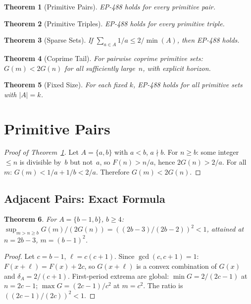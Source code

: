 \documentclass[11pt,a4paper]{article}
\newtheorem{theorem}{Theorem}[section]
\theoremstyle{definition}
\begin{document}
\begin{theorem}[Primitive Pairs]\label{thm:pairs}
EP-488 holds for every primitive pair.
\end{theorem}

\begin{theorem}[Primitive Triples]\label{thm:triples}
EP-488 holds for every primitive triple.
\end{theorem}

\begin{theorem}[Sparse Sets]\label{thm:sparse}
If $\sum_{a \in A} 1/a \leq 2/\min(A)$, then EP-488 holds.
\end{theorem}

\begin{theorem}[Coprime Tail]\label{thm:coprime-tail}
For pairwise coprime primitive sets: $G(m) < 2G(n)$ for all
sufficiently large~$n$, with explicit horizon.
\end{theorem}

\begin{theorem}[Fixed Size]\label{thm:fixed-k}
For each fixed $k$, EP-488 holds for all primitive sets with $|A| = k$.
\end{theorem}

\section{Primitive Pairs}

\begin{proof}[Proof of Theorem~\ref{thm:pairs}]
Let $A = \{a, b\}$ with $a < b$, $a \nmid b$. For $n \geq b$: some
integer $\leq n$ is divisible by~$b$ but not~$a$, so $F(n) > n/a$,
hence $2G(n) > 2/a$. For all~$m$:
$G(m) < 1/a + 1/b < 2/a$. Therefore $G(m) < 2G(n)$.
\end{proof}

\subsection{Adjacent Pairs: Exact Formula}

\begin{theorem}\label{thm:adjacent}
For $A = \{b{-}1, b\}$, $b \geq 4$:
$\sup_{m>n \geq b} G(m)/(2G(n)) = ((2b{-}3)/(2b{-}2))^2 < 1$,
attained at $n = 2b{-}3$, $m = (b{-}1)^2$.
\end{theorem}

\begin{proof}
Let $c = b{-}1$, $\ell = c(c{+}1)$. Since $\gcd(c,c{+}1) = 1$:
$F(x{+}\ell) = F(x) + 2c$, so $G(x{+}\ell)$ is a convex combination
of $G(x)$ and $\delta_A = 2/(c{+}1)$. First-period extrema are global:
$\min G = 2/(2c{-}1)$ at $n = 2c{-}1$; $\max G = (2c{-}1)/c^2$ at
$m = c^2$. The ratio is $((2c{-}1)/(2c))^2 < 1$.
\end{proof}
\end{document}
